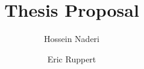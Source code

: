 \documentclass[12pt]{article}
\begin{document}
\title{Thesis Proposal}
\author{Hossein Naderi \and Eric Ruppert}
\maketitle

\end{document}
